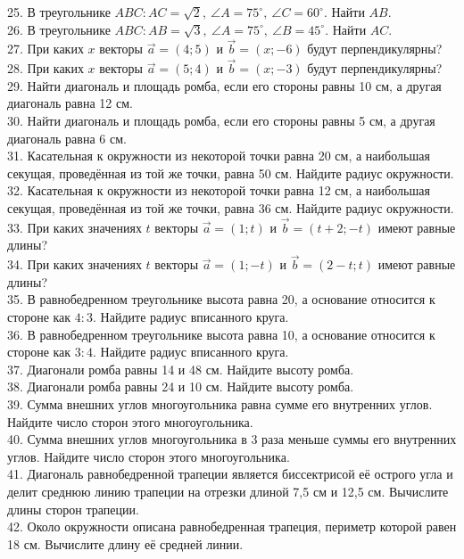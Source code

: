 25. В треугольнике $ABC: AC=\sqrt{2},\ \angle A=75^\circ,\ \angle C=60^\circ.$ Найти $AB.$\\
26. В треугольнике $ABC: AB=\sqrt{3},\ \angle A=75^\circ,\ \angle B=45^\circ.$ Найти $AC.$\\
27. При каких $x$ векторы $\vec{a}=(4;5)$ и $\vec{b}=(x;-6)$ будут перпендикулярны?\\
28. При каких $x$ векторы $\vec{a}=(5;4)$ и $\vec{b}=(x;-3)$ будут перпендикулярны?\\
29. Найти диагональ и площадь ромба, если его стороны равны 10 см, а другая диагональ равна 12 см.\\
30. Найти диагональ и площадь ромба, если его стороны равны 5 см, а другая диагональ равна 6 см.\\
31. Касательная к окружности из некоторой точки равна 20 см, а наибольшая секущая, проведённая из той же точки, равна 50 см. Найдите радиус окружности.\\
32. Касательная к окружности из некоторой точки равна 12 см, а наибольшая секущая, проведённая из той же точки, равна 36 см. Найдите радиус окружности.\\
33. При каких значениях $t$ векторы $\vec{a}=(1;t)$ и $\vec{b}=(t+2;-t)$ имеют равные длины?\\
34. При каких значениях $t$ векторы $\vec{a}=(1;-t)$ и $\vec{b}=(2-t;t)$ имеют равные длины?\\
35. В равнобедренном треугольнике высота равна 20, а основание относится к стороне как $4:3.$ Найдите радиус вписанного круга.\\
36. В равнобедренном треугольнике высота равна 10, а основание относится к стороне как $3:4.$ Найдите радиус вписанного круга.\\
37. Диагонали ромба равны 14 и 48 см. Найдите высоту ромба.\\
38. Диагонали ромба равны 24 и 10 см. Найдите высоту ромба.\\
39. Сумма внешних углов многоугольника равна сумме его внутренних углов. Найдите число сторон этого многоугольника.\\
40. Сумма внешних углов многоугольника в 3 раза меньше суммы его внутренних углов. Найдите число сторон этого многоугольника.\\
41. Диагональ равнобедренной трапеции является биссектрисой её острого угла и делит среднюю линию трапеции на отрезки длиной 7,5 см и 12,5 см. Вычислите длины сторон трапеции.\\
42. Около окружности описана равнобедренная трапеция, периметр которой равен 18 см. Вычислите длину её средней линии.\\
